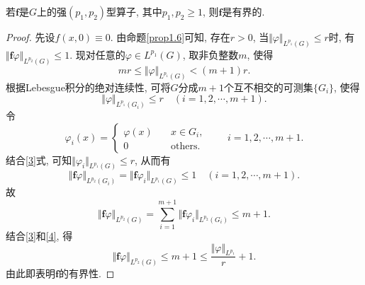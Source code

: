 \begin{proposition}\label{prop1.7}
    若$\bm{f}$是$G$上的强$(p_1, p_2)$型算子, 其中$p_1, p_2 \geq 1$, 则$\bm{f}$是有界的.
    \begin{proof}
        先设$f(x, 0) \equiv 0$. 由命题\ref{prop1.6}可知, 存在$r > 0$, 当$\Vert \varphi\Vert_{L^{p_1}(G)} \leq r$时, 有$\Vert \bm{f}\varphi\Vert_{L^{p_2}(G)} \leq 1$. 现对任意的$\varphi \in L^{p_1}(G)$, 取非负整数$m$, 使得 
        \begin{equation*}
            mr \leq \Vert \varphi\Vert_{L^{p_1}(G)} < (m + 1)r.
        \end{equation*}
        根据Lebesgue积分的绝对连续性, 可将$G$分成$m + 1$个互不相交的可测集$\{G_i\}$, 使得 
        \begin{equation}\label{3}
            \Vert \varphi\Vert_{L^{p_1}(G_i)} \leq r \quad (i = 1, 2, \cdots, m + 1).
        \end{equation}
        令 
        \begin{equation*}
            \varphi_i(x) = 
            \begin{cases}
                \varphi(x) \quad &x \in G_i, \\ 
                0 \quad &\text{others}.
            \end{cases} \qquad i = 1, 2, \cdots, m + 1.
        \end{equation*}
        结合\eqref{3}式, 可知$\Vert \varphi_i\Vert_{L^{p_1}(G)} \leq r$, 从而有 
        \begin{equation*}
            \Vert \bm{f}\varphi\Vert_{L^{p_2}(G_i)} = \Vert \bm{f}\varphi_i\Vert_{L^{p_1}(G)} \leq 1 \quad (i = 1, 2, \cdots, m + 1).
        \end{equation*}
        故 
        \begin{equation}\label{4}
            \Vert \bm{f}\varphi\Vert_{L^{p_2}(G)} = \sum_{i = 1}^{m + 1}\Vert \bm{f}\varphi_i\Vert_{L^{p_2}(G_i)} \leq m + 1.
        \end{equation}
        结合\eqref{3}和\eqref{4}, 得 
        \begin{equation*}
            \Vert \bm{f}\varphi\Vert_{L^{p_2}(G)} \leq m + 1 \leq \frac{\Vert \varphi\Vert_{L^{p_1}}}{r} + 1.
        \end{equation*}
        由此即表明$\bm{f}$的有界性.


\end{proof}
\end{proposition}
